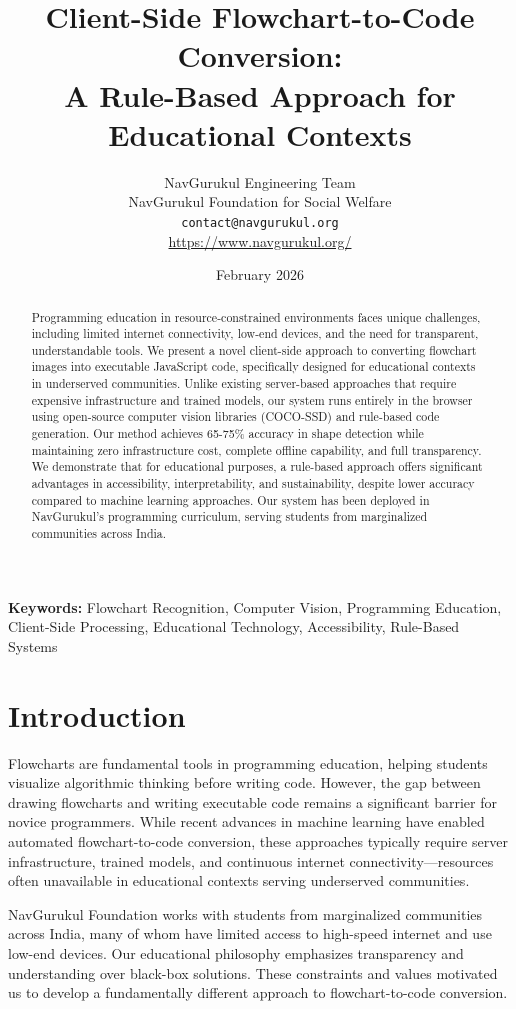 \documentclass[11pt,a4paper]{article}
\title{Client-Side Flowchart-to-Code Conversion:\\
A Rule-Based Approach for Educational Contexts}
\author{
    NavGurukul Engineering Team\\
    NavGurukul Foundation for Social Welfare\\
    \texttt{contact@navgurukul.org}\\
    \url{https://www.navgurukul.org/}
}
\date{February 2026}
\begin{document}
\maketitle

\begin{abstract}
Programming education in resource-constrained environments faces unique challenges, including limited internet connectivity, low-end devices, and the need for transparent, understandable tools. We present a novel client-side approach to converting flowchart images into executable JavaScript code, specifically designed for educational contexts in underserved communities. Unlike existing server-based approaches that require expensive infrastructure and trained models, our system runs entirely in the browser using open-source computer vision libraries (COCO-SSD) and rule-based code generation. Our method achieves 65-75\% accuracy in shape detection while maintaining zero infrastructure cost, complete offline capability, and full transparency. We demonstrate that for educational purposes, a rule-based approach offers significant advantages in accessibility, interpretability, and sustainability, despite lower accuracy compared to machine learning approaches. Our system has been deployed in NavGurukul's programming curriculum, serving students from marginalized communities across India.
\end{abstract}

\noindent\textbf{Keywords:} Flowchart Recognition, Computer Vision, Programming Education, Client-Side Processing, Educational Technology, Accessibility, Rule-Based Systems

\section{Introduction}

Flowcharts are fundamental tools in programming education, helping students visualize algorithmic thinking before writing code. However, the gap between drawing flowcharts and writing executable code remains a significant barrier for novice programmers. While recent advances in machine learning have enabled automated flowchart-to-code conversion, these approaches typically require server infrastructure, trained models, and continuous internet connectivity---resources often unavailable in educational contexts serving underserved communities.

NavGurukul Foundation works with students from marginalized communities across India, many of whom have limited access to high-speed internet and use low-end devices. Our educational philosophy emphasizes transparency and understanding over black-box solutions. These constraints and values motivated us to develop a fundamentally different approach to flowchart-to-code conversion.
\end{document}
